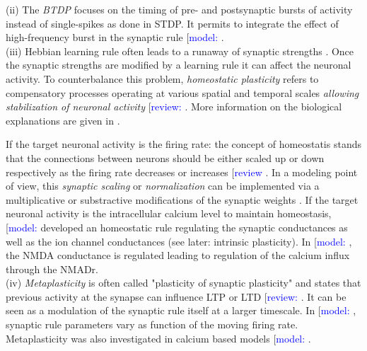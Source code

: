 (ii) The \textit{\acrfull{BTDP}} focuses on the timing of pre- and postsynaptic bursts of activity instead of single-spikes as done in STDP. It permits to integrate the effect of high-frequency burst in the synaptic rule [\textcolor{blue}{model:} \cite{gjorgjieva_burst-time-dependent_2009, delattre_network-timing-dependent_2015, payeur_burst-dependent_2020}.\\


(iii)  Hebbian learning rule often leads to a runaway of synaptic strengths \citep{babadi_stability_2016}. Once the synaptic strengths are modified by a learning rule it can affect the neuronal activity. To counterbalance this problem,  \textit{homeostatic plasticity} refers to compensatory processes operating at various spatial and temporal scales \textit{allowing stabilization of neuronal activity}
[\textcolor{blue}{review:} \cite{turrigiano_homeostatic_2004, karabanov_consensus_2015, meriney_synaptic_2019,desai_homeostatic_2003}. More information on the biological explanations are given in \citep{shepherd_arcarg31_2006}. 

If the target neuronal activity is the firing rate: the concept of homeostatis stands that the connections between neurons should be either scaled up or down respectively as the firing rate decreases or increases [\textcolor{blue}{review} \cite{desai_homeostatic_2016}. In a modeling point of view, this \textit{synaptic scaling} or \textit{normalization} can be implemented via a multiplicative or substractive modifications of the synaptic weights
\citep{oja_simplified_1982}.  If the target neuronal activity is the intracellular calcium level to maintain homeostasis, [\textcolor{blue}{model:} \cite{oleary_cell_2014} developed an homeostatic rule regulating the synaptic conductances as well as the ion channel conductances (see later: intrinsic plasticity). In [\textcolor{blue}{model:} \cite{yeung_synaptic_2004}, the NMDA conductance is regulated leading to regulation of the calcium influx through the NMADr.   \\

(iv) \textit{Metaplasticity} is often called "plasticity of synaptic plasticity" and states that previous activity at the synapse can influence LTP or LTD  [\textcolor{blue}{review:} \cite{ abraham_metaplasticity_1996, abraham_metaplasticity_2008, abraham_is_2019,  meriney_synaptic_2019, deisseroth_synaptic_1995, yger_models_2015, lee_mechanisms_2019}. It can be seen as a modulation of the synaptic rule itself at a larger timescale. In [\textcolor{blue}{model:} \cite{zenke_synaptic_2013, benuskova_stdp_2007}, synaptic rule parameters vary as function of the moving firing rate. Metaplasticity was also investigated in calcium based models [\textcolor{blue}{model:} \cite{yu_biophysical_2008, anirudhan_analogous_2015}.

